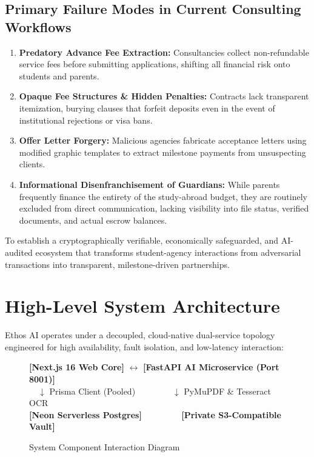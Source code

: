\documentclass[11pt,a4paper]{article}
\begin{document}
\subsection{Primary Failure Modes in Current Consulting Workflows}
\begin{enumerate}[label=\textbf{\arabic*.}]
    \item \textbf{Predatory Advance Fee Extraction:} Consultancies collect non-refundable service fees before submitting applications, shifting all financial risk onto students and parents.
    \item \textbf{Opaque Fee Structures \& Hidden Penalties:} Contracts lack transparent itemization, burying clauses that forfeit deposits even in the event of institutional rejections or visa bans.
    \item \textbf{Offer Letter Forgery:} Malicious agencies fabricate acceptance letters using modified graphic templates to extract milestone payments from unsuspecting clients.
    \item \textbf{Informational Disenfranchisement of Guardians:} While parents frequently finance the entirety of the study-abroad budget, they are routinely excluded from direct communication, lacking visibility into file status, verified documents, and actual escrow balances.
\end{enumerate}

\begin{tcolorbox}[colback=lightgraybg,colframe=primaryblue,title=\textbf{The Ethos AI Mission}]
To establish a cryptographically verifiable, economically safeguarded, and AI-audited ecosystem that transforms student-agency interactions from adversarial transactions into transparent, milestone-driven partnerships.
\end{tcolorbox}

\section{High-Level System Architecture}

Ethos AI operates under a decoupled, cloud-native dual-service topology engineered for high availability, fault isolation, and low-latency interaction:

\begin{figure}[htbp]
\centering
\begin{tcolorbox}[colback=white,colframe=darkslate,title=\textbf{System Topography \& Data Flow}]
\small
\textbf{[Next.js 16 Web Core]} $\longleftrightarrow$ \textbf{[FastAPI AI Microservice (Port 8001)]}\\
$\quad \downarrow$ Prisma Client (Pooled) $\quad\quad\quad\quad \downarrow$ PyMuPDF \& Tesseract OCR\\
\textbf{[Neon Serverless Postgres]} $\quad\quad\quad\quad$ \textbf{[Private S3-Compatible Vault]}
\end{tcolorbox}
\caption{System Component Interaction Diagram}
\end{figure}
\end{document}
